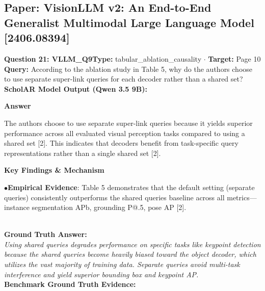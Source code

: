 \documentclass[10pt,a4paper]{article}
\begin{document}
\subsection{Paper: VisionLLM v2: An End-to-End Generalist Multimodal Large Language Model [2406.08394]}
\vspace{-4pt}
\begin{tcolorbox}[questionbox]
{\noindent\bfseries\large\color{navy} Question 21: VLLM\_Q9}\hfill {\footnotesize\color{darkteal}\textbf{Type:} tabular\_ablation\_causality $\cdot$ \textbf{Target:} Page 10}\\[4pt]
{\noindent\bfseries\color{accentblue} Query: } According to the ablation study in Table 5, why do the authors choose to use separate super-link queries for each decoder rather than a shared set?\\[6pt]
{\noindent\bfseries\color{navy} ScholAR Model Output (Qwen 3.5 9B):}\\[2pt]
{\small \noindent \textbf{Answer}\par\vspace{3pt}The authors choose to use separate super-link queries because it yields superior performance across all evaluated visual perception tasks compared to using a shared set [2].  This indicates that decoders benefit from task-specific query representations rather than a single shared set [2].\par\vspace{3pt}\noindent \textbf{Key Findings \& Mechanism}\par\vspace{3pt}\noindent\hspace*{8pt}$\bullet$\hspace*{4pt}\textbf{Empirical Evidence}: Table 5  demonstrates that the default setting (separate queries) consistently outperforms the shared queries baseline across all metrics---instance segmentation APb, grounding P@.5, pose AP [2].}\\[6pt]
{\noindent\bfseries\color{darkteal} Ground Truth Answer:}\\[2pt]
{\small\itshape Using shared queries degrades performance on specific tasks like keypoint detection because the shared queries become heavily biased toward the object decoder, which utilizes the vast majority of training data. Separate queries avoid multi-task interference and yield superior bounding box and keypoint AP.}\\[4pt]
{\noindent\bfseries\color{darkteal} Benchmark Ground Truth Evidence:}\\[2pt]

\end{tcolorbox}
\end{document}
